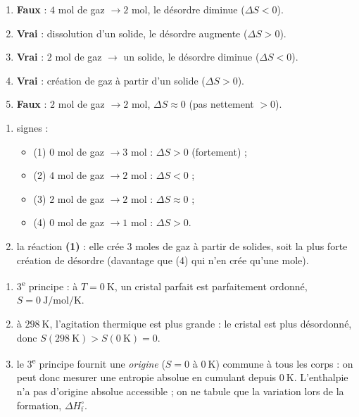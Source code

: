 \documentclass[11pt,a4paper]{article}
\begin{document}
\begin{corrige}
\begin{enumerate}[label=\alph*)]
  \item \textbf{Faux} : $4$ mol de gaz $\to 2$ mol, le désordre diminue ($\Delta S<0$).
  \item \textbf{Vrai} : dissolution d'un solide, le désordre augmente ($\Delta S>0$).
  \item \textbf{Vrai} : $2$ mol de gaz $\to$ un solide, le désordre diminue ($\Delta S<0$).
  \item \textbf{Vrai} : création de gaz à partir d'un solide ($\Delta S>0$).
  \item \textbf{Faux} : $2$ mol de gaz $\to 2$ mol, $\Delta S\approx 0$ (pas nettement $>0$).
\end{enumerate}
\end{corrige}

\begin{corrige}
\begin{enumerate}[label=\alph*)]
  \item signes :
  \begin{itemize}[leftmargin=1.4em,topsep=1pt,itemsep=1pt]
    \item (1) $0$ mol de gaz $\to 3$ mol : $\Delta S>0$ (fortement) ;
    \item (2) $4$ mol de gaz $\to 2$ mol : $\Delta S<0$ ;
    \item (3) $2$ mol de gaz $\to 2$ mol : $\Delta S\approx 0$ ;
    \item (4) $0$ mol de gaz $\to 1$ mol : $\Delta S>0$.
  \end{itemize}
  \item la réaction \textbf{(1)} : elle crée $3$ moles de gaz à partir de solides, soit la plus forte création de désordre (davantage que (4) qui n'en crée qu'une mole).
\end{enumerate}
\end{corrige}

\begin{corrige}
\begin{enumerate}[label=\alph*)]
  \item 3\textsuperscript{e} principe : à $T=\qty{0}{\kelvin}$, un cristal parfait est parfaitement ordonné, $S=\qty{0}{\joule\per\mol\per\kelvin}$.
  \item à $\qty{298}{\kelvin}$, l'agitation thermique est plus grande : le cristal est plus désordonné, donc $S(\qty{298}{\kelvin}) > S(\qty{0}{\kelvin}) = 0$.
  \item le 3\textsuperscript{e} principe fournit une \emph{origine} ($S=0$ à $\qty{0}{\kelvin}$) commune à tous les corps : on peut donc mesurer une entropie absolue en cumulant depuis $\qty{0}{\kelvin}$. L'enthalpie n'a pas d'origine absolue accessible ; on ne tabule que la variation lors de la formation, $\Delta H^\circ_{\text{f}}$.
\end{enumerate}
\end{corrige}
\end{document}
